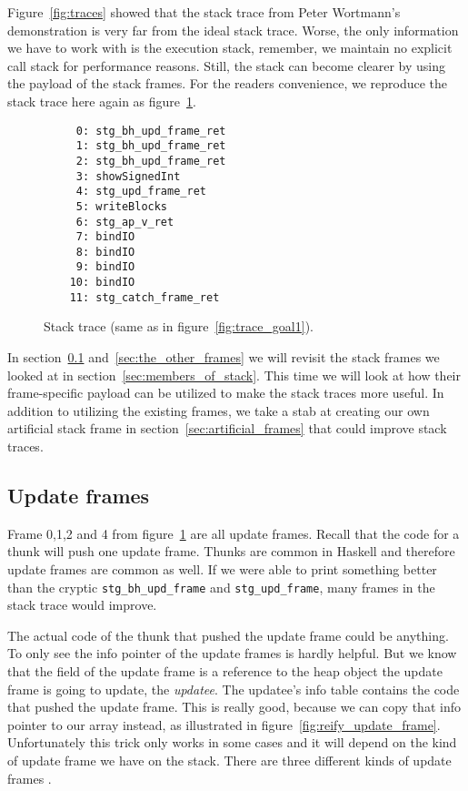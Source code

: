 Figure~\ref{fig:traces} showed that the stack trace from Peter Wortmann's
demonstration is very far from the ideal stack trace.  Worse, the only
information we have to work with is the execution stack, remember, we maintain no
explicit call stack for performance reasons. Still, the stack can become
clearer by using the payload of the stack frames. For the readers convenience,
we reproduce the stack trace here again as figure~\ref{fig:traces_2}.

\begin{figure}
\begin{mdframed}
  \begin{verbatim}
     0: stg_bh_upd_frame_ret
     1: stg_bh_upd_frame_ret
     2: stg_bh_upd_frame_ret
     3: showSignedInt
     4: stg_upd_frame_ret
     5: writeBlocks
     6: stg_ap_v_ret
     7: bindIO
     8: bindIO
     9: bindIO
    10: bindIO
    11: stg_catch_frame_ret
  \end{verbatim}
        \caption{Stack trace (same as in figure~\ref{fig:trace_goal1}).}
        \label{fig:traces_2}
\end{mdframed}
\end{figure}

In section~\ref{sec:update_frames} and~\ref{sec:the_other_frames}
we will revisit the stack frames we looked at in
section~\ref{sec:members_of_stack}. This time we will look at how
their frame-specific payload can be utilized to make the stack
traces more useful. In addition to utilizing the existing frames, we
take a stab at creating our own artificial stack frame in
section~\ref{sec:artificial_frames} that could improve stack traces.

\subsection{Update frames} \label{sec:update_frames}

Frame 0,1,2 and 4 from figure~\ref{fig:traces_2} are all update
frames. Recall that the code for a thunk will push one update
frame. Thunks are common in Haskell and therefore update frames are common
as well. If we were able to print something better
than the cryptic \texttt{stg\_bh\_upd\_frame} and \texttt{stg\_upd\_frame},
many frames in the stack trace would improve.

The actual code of the thunk that pushed the update frame
could be anything. To only see the info pointer of the update frames is hardly helpful.
But we know that the field of the update frame is a reference to the
heap object the update frame is going to update, the \emph{updatee}. The updatee's
info table contains the code that pushed the update frame.
This is really good, because we can copy that info pointer to our array instead,
as illustrated in figure~\ref{fig:reify_update_frame}.
Unfortunately this trick only works in some cases and it will depend on the kind of
update frame we have on the stack. There are three different kinds of
update frames \cite{github_updates_cmm}.

